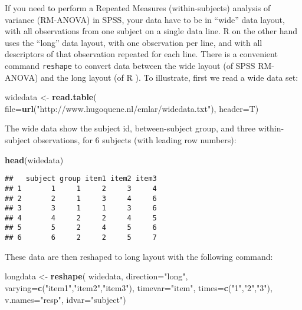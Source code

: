\documentclass[]{book}
\newenvironment{Shaded}{\begin{snugshade}}{\end{snugshade}}
\newcommand{\DataTypeTok}[1]{\textcolor[rgb]{0.13,0.29,0.53}{#1}}
\newcommand{\KeywordTok}[1]{\textcolor[rgb]{0.13,0.29,0.53}{\textbf{#1}}}
\newcommand{\NormalTok}[1]{#1}
\newcommand{\StringTok}[1]{\textcolor[rgb]{0.31,0.60,0.02}{#1}}
\begin{document}
If you need to perform a
Repeated Measures (within-subjects) analysis of variance (RM-ANOVA)
in SPSS, your data have to be in ``wide'' data layout, with all
observations from one subject on a single data line.
R on the other hand uses the ``long'' data layout, with
one observation per line, and with all descriptors of that
observation repeated for each line. There is a convenient command
\texttt{reshape} to convert data between the wide
layout (of SPSS RM-ANOVA) and the long layout (of R ).
To illustrate, first we read a wide data set:

\begin{Shaded}
\begin{Highlighting}[]
\NormalTok{widedata <-}\StringTok{ }\KeywordTok{read.table}\NormalTok{( }
  \DataTypeTok{file=}\KeywordTok{url}\NormalTok{(}\StringTok{"http://www.hugoquene.nl/emlar/widedata.txt"}\NormalTok{),}
  \DataTypeTok{header=}\NormalTok{T)}
\end{Highlighting}
\end{Shaded}

The wide data show the subject id, between-subject group, and three
within-subject observations, for 6 subjects (with leading row
numbers):

\begin{Shaded}
\begin{Highlighting}[]
\KeywordTok{head}\NormalTok{(widedata)}
\end{Highlighting}
\end{Shaded}

\begin{verbatim}
##   subject group item1 item2 item3
## 1       1     1     2     3     4
## 2       2     1     3     4     6
## 3       3     1     1     3     6
## 4       4     2     2     4     5
## 5       5     2     4     5     6
## 6       6     2     2     5     7
\end{verbatim}

These data are then reshaped to long layout with the following
command:

\begin{Shaded}
\begin{Highlighting}[]
\NormalTok{longdata <-}\StringTok{ }\KeywordTok{reshape}\NormalTok{( widedata, }\DataTypeTok{direction=}\StringTok{"long"}\NormalTok{,}
                     \DataTypeTok{varying=}\KeywordTok{c}\NormalTok{(}\StringTok{"item1"}\NormalTok{,}\StringTok{"item2"}\NormalTok{,}\StringTok{"item3"}\NormalTok{),}
                     \DataTypeTok{timevar=}\StringTok{"item"}\NormalTok{, }\DataTypeTok{times=}\KeywordTok{c}\NormalTok{(}\StringTok{"1"}\NormalTok{,}\StringTok{"2"}\NormalTok{,}\StringTok{"3"}\NormalTok{),}
                     \DataTypeTok{v.names=}\StringTok{"resp"}\NormalTok{, }\DataTypeTok{idvar=}\StringTok{"subject"}\NormalTok{)}
\end{Highlighting}
\end{Shaded}
\end{document}
